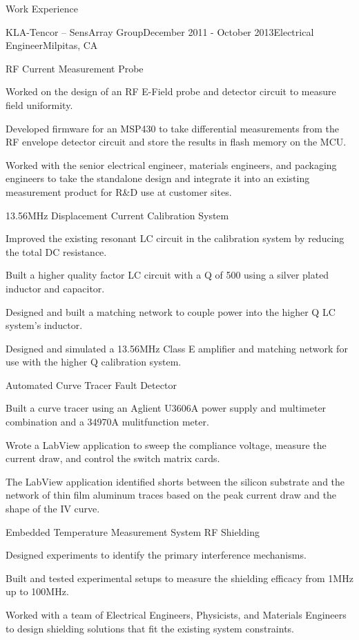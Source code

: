\documentclass{resume} %
\begin{document}
\begin{rSection}{Work Experience}
\begin{rSubsection2}{KLA-Tencor -- SensArray Group}{December 2011 - October 2013}{Electrical Engineer}{Milpitas, CA}
\pagebreak[2]
\begin{rWorkProject}{RF Current Measurement Probe}
\item Worked on the design of an RF E-Field probe and detector circuit to measure field uniformity.
\item Developed firmware for an MSP430 to take differential measurements from the RF envelope detector circuit and store the results in flash memory on the MCU.
\item Worked with the senior electrical engineer, materials engineers, and packaging engineers to take the standalone design and integrate it into an existing measurement product for R\&D use at customer sites.
\end{rWorkProject}

\pagebreak[2]
\begin{rWorkProject}{13.56MHz Displacement Current Calibration System}
\item Improved the existing resonant LC circuit in the calibration system by reducing the total DC resistance.
\item Built a higher quality factor LC circuit with a Q of 500 using a silver plated inductor and capacitor.
\item Designed and built a matching network to couple power into the higher Q LC system's inductor.
\item Designed and simulated a 13.56MHz Class E amplifier and matching network for use with the higher Q calibration system.
\end{rWorkProject}

\pagebreak[2]
\begin{rWorkProject}{Automated Curve Tracer Fault Detector}
\item Built a curve tracer using an Aglient U3606A power supply and multimeter combination and a 34970A mulitfunction meter.
\item Wrote a LabView application to sweep the compliance voltage, measure the current draw, and control the switch matrix cards.
\item The LabView application identified shorts between the silicon substrate and the network of thin film aluminum traces based on the peak current draw and the shape of the IV curve.
\end{rWorkProject}

\pagebreak[1]
\begin{rWorkProject}{Embedded Temperature Measurement System RF Shielding}
\item Designed experiments to identify the primary interference mechanisms.
\item Built and tested experimental setups to measure the shielding efficacy from 1MHz up to 100MHz.
\item Worked with a team of Electrical Engineers, Physicists, and Materials Engineers to design shielding solutions that fit the existing system constraints.
\end{rWorkProject}


\end{rSubsection2}
\end{rSection}
\end{document}
